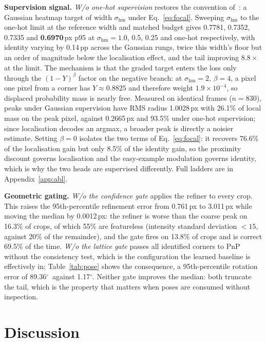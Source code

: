 \documentclass[10pt,twocolumn,letterpaper]{article}
\newcommand{\dgr}{$^\circ$}
\begin{document}
\textbf{Supervision signal.}
\label{sec:abl_sup}
\emph{W/o one-hot supervision} restores the convention of~\cite{cornernet}: a Gaussian heatmap
target of width $\sigma_{\mathrm{hm}}$ under Eq.~\ref{eq:focal}. Sweeping $\sigma_{\mathrm{hm}}$ to
the one-hot limit at the reference width and matched budget gives 0.7781, 0.7352, 0.7335 and
\textbf{0.6970}\,px p95 at $\sigma_{\mathrm{hm}} = 1.0$, 0.5, 0.25 and one-hot respectively, with
identity varying by 0.14\,pp across the Gaussian rungs, twice this width's floor but an order of
magnitude below the localisation effect, and the tail improving $8.8\times$ at the limit. The
mechanism is that the graded target enters the loss only through the $(1-Y)^{\beta}$ factor on the
negative branch: at $\sigma_{\mathrm{hm}}=2$, $\beta=4$, a pixel one pixel from a corner has
$Y \approx 0.8825$ and therefore weight $1.9\times10^{-4}$, so displaced probability mass is nearly
free. Measured on identical frames ($n=830$), peaks under Gaussian supervision have RMS radius
1.0028\,px with 26.1\% of local mass on the peak pixel, against 0.2665\,px and 93.5\% under one-hot
supervision; since localisation decodes an argmax, a broader peak is directly a noisier estimate.
Setting $\beta=0$ isolates the two terms of Eq.~\ref{eq:focal}: it recovers 76.6\% of the
localisation gain but only 8.5\% of the identity gain, so the proximity discount governs
localisation and the easy-example modulation governs identity, which is why the two heads are
supervised differently. Full ladders are in Appendix~\ref{app:abl}.

\textbf{Geometric gating.}
\label{sec:abl_gate}
\emph{W/o the confidence gate} applies the refiner to every crop. This raises the 95th-percentile
refinement error from 0.761\,px to 3.011\,px while moving the median by 0.0012\,px: the refiner is
worse than the coarse peak on 16.3\% of crops, of which 55\% are featureless (intensity standard
deviation $<15$, against 20\% of the remainder), and the gate fires on 13.8\% of crops and is
correct 69.5\% of the time. \emph{W/o the lattice gate} passes all identified corners to PnP
without the consistency test, which is the configuration the learned baseline is effectively in;
Table~\ref{tab:pose} shows the consequence, a 95th-percentile rotation error of 89.36\dgr\ against
1.17\dgr. Neither gate improves the median: both truncate the tail, which is the property that
matters when poses are consumed without inspection.

\section{Discussion}
\end{document}
